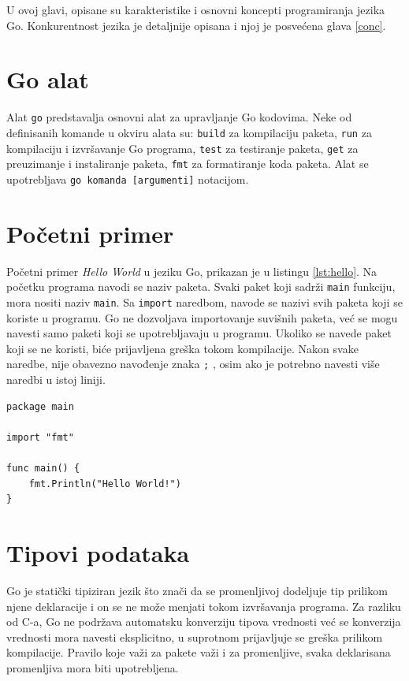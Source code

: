 \documentclass[12pt,oneside]{memoir}
\begin{document}
U ovoj glavi, opisane su karakteristike i osnovni koncepti programiranja jezika Go.  Konkurentnost jezika je detaljnije opisana i njoj je posvećena glava \ref{conc}.

\section{Go alat}

Alat \texttt{go} predstavalja osnovni alat za upravljanje Go kodovima. Neke od definisanih komande u okviru alata su: \texttt{build} za kompilaciju paketa, \texttt{run} za kompilaciju i izvršavanje Go programa, \texttt{test} za testiranje paketa, \texttt{get} za preuzimanje i instaliranje paketa, \texttt{fmt} za formatiranje koda paketa. Alat se upotrebljava \texttt{go komanda [argumenti]} notacijom.

\section{Početni primer}

Početni primer \textit{Hello World} u jeziku Go, prikazan je u listingu \ref{lst:hello}. Na početku programa navodi se naziv paketa. Svaki paket koji sadrži \texttt{main} funkciju, mora nositi naziv \texttt{main}. Sa \texttt{import} naredbom, navode se nazivi svih paketa koji se koriste u programu. Go ne dozvoljava importovanje suvišnih paketa, već se mogu navesti samo paketi koji se upotrebljavaju u programu. Ukoliko se navede paket koji se ne koristi, biće prijavljena greška tokom kompilacije. Nakon svake naredbe, nije obavezno navođenje znaka \texttt{;} , osim ako je potrebno navesti više naredbi u istoj liniji. 

\begin{center}
\begin{lstlisting}[caption=Hello World program u jeziku Go,label={lst:hello},  backgroundcolor=\color{background}]
package main

import "fmt"

func main() {
	fmt.Println("Hello World!")
}
\end{lstlisting}
\end{center}

\section{Tipovi podataka}

Go je statički tipiziran jezik što znači da se promenljivoj dodeljuje tip prilikom njene deklaracije i on se ne može menjati tokom izvršavanja programa. Za razliku od C-a, Go ne podržava automatsku konverziju tipova vrednosti već se konverzija vrednosti mora navesti eksplicitno, u suprotnom prijavljuje se greška prilikom kompilacije. Pravilo koje važi za pakete važi i za promenljive, svaka deklarisana promenljiva mora biti upotrebljena.
\end{document}
